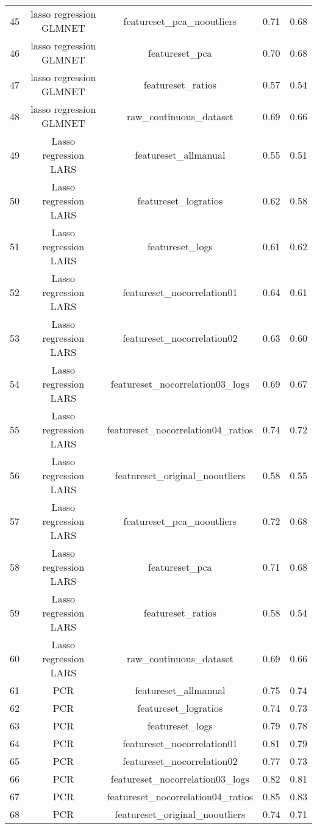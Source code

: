 \begin{tabular}{ccccc}
  45 & lasso regression GLMNET & featureset\_pca\_nooutliers & 0.71 & 0.68 \\ 
  46 & lasso regression GLMNET & featureset\_pca & 0.70 & 0.68 \\ 
  47 & lasso regression GLMNET & featureset\_ratios & 0.57 & 0.54 \\ 
  48 & lasso regression GLMNET & raw\_continuous\_dataset & 0.69 & 0.66 \\ 
  49 & Lasso regression LARS & featureset\_allmanual & 0.55 & 0.51 \\ 
  50 & Lasso regression LARS & featureset\_logratios & 0.62 & 0.58 \\ 
  51 & Lasso regression LARS & featureset\_logs & 0.61 & 0.62 \\ 
  52 & Lasso regression LARS & featureset\_nocorrelation01 & 0.64 & 0.61 \\ 
  53 & Lasso regression LARS & featureset\_nocorrelation02 & 0.63 & 0.60 \\ 
  54 & Lasso regression LARS & featureset\_nocorrelation03\_logs & 0.69 & 0.67 \\ 
  55 & Lasso regression LARS & featureset\_nocorrelation04\_ratios & 0.74 & 0.72 \\ 
  56 & Lasso regression LARS & featureset\_original\_nooutliers & 0.58 & 0.55 \\ 
  57 & Lasso regression LARS & featureset\_pca\_nooutliers & 0.72 & 0.68 \\ 
  58 & Lasso regression LARS & featureset\_pca & 0.71 & 0.68 \\ 
  59 & Lasso regression LARS & featureset\_ratios & 0.58 & 0.54 \\ 
  60 & Lasso regression LARS & raw\_continuous\_dataset & 0.69 & 0.66 \\ 
  61 & PCR & featureset\_allmanual & 0.75 & 0.74 \\ 
  62 & PCR & featureset\_logratios & 0.74 & 0.73 \\ 
  63 & PCR & featureset\_logs & 0.79 & 0.78 \\ 
  64 & PCR & featureset\_nocorrelation01 & 0.81 & 0.79 \\ 
  65 & PCR & featureset\_nocorrelation02 & 0.77 & 0.73 \\ 
  66 & PCR & featureset\_nocorrelation03\_logs & 0.82 & 0.81 \\ 
  67 & PCR & featureset\_nocorrelation04\_ratios & 0.85 & 0.83 \\ 
  68 & PCR & featureset\_original\_nooutliers & 0.74 & 0.71 \\ 
   \hline
\end{tabular}
